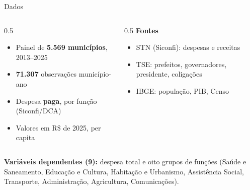 \documentclass[aspectratio=169,9pt]{beamer}
\begin{document}
\begin{frame}{Dados}
  \begin{columns}[T]
    \begin{column}{0.5\textwidth}
      \begin{itemize}
        \item Painel de \textbf{5.569 municípios}, 2013--2025
        \item \textbf{71.307} observações município-ano
        \item Despesa \textbf{paga}, por função (Siconfi/DCA)
        \item Valores em R\$ de 2025, per capita
      \end{itemize}
    \end{column}
    \begin{column}{0.5\textwidth}
      \textbf{Fontes}
      \begin{itemize}
        \item STN (Siconfi): despesas e receitas
        \item TSE: prefeitos, governadores, presidente, coligações
        \item IBGE: população, PIB, Censo
      \end{itemize}
    \end{column}
  \end{columns}
  \vspace{1em}
  \textbf{Variáveis dependentes (9):} despesa total e oito grupos de funções (Saúde e Saneamento, Educação e Cultura, Habitação e Urbanismo, Assistência Social, Transporte, Administração, Agricultura, Comunicações).
\end{frame}
\end{document}
